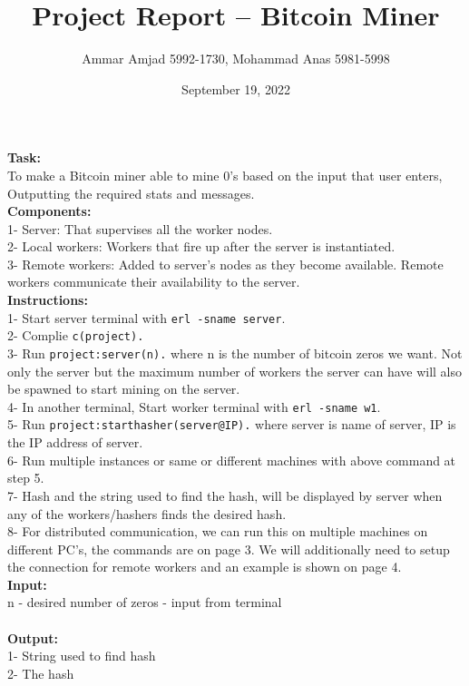 \documentclass[11pt, pdftex]{article}
\title{ Project Report – Bitcoin Miner }
\author{ Ammar Amjad 5992-1730, Mohammad Anas 5981-5998 }
\date{ September 19, 2022 }
\begin{document}
	\pagestyle{fancy}
	\fancyhead{}
	\fancyfoot{}
	\maketitle 
	
	
	\textbf{Task:} \\ 
	To make a Bitcoin miner able to mine 0’s based on the input that user enters, Outputting the required stats and messages. \\ 
	
	\textbf{Components:} \\
	1-	Server: That supervises all the worker nodes. \\
	2-	Local workers: Workers that fire up after the server is instantiated. \\
	3-	Remote workers: Added to server’s nodes as they become available. Remote workers communicate their availability to the server. \\
	
	\textbf{Instructions:} \\
	1-	Start server terminal with \texttt{erl -sname server}. \\
	2-	Complie \texttt{c(project).} \\
	3-	Run \texttt{project:server(n).} where n is the number of bitcoin zeros we want. Not only the server but the maximum number of workers the server can have will also be spawned to start mining on the server. \\
	4-	In another terminal, Start worker terminal with \texttt{erl -sname w1}. \\
	5-	Run \texttt{project:starthasher(server@IP).} where server is name of server, IP is the IP address of server. \\
	6-	Run multiple instances or same or different machines with above command at step 5. \\
	7-	Hash and the string used to find the hash, will be displayed by server when any of the workers/hashers finds the desired hash. \\
	8-	For distributed communication, we can run this on multiple machines on different PC’s, the commands are on page 3. We will additionally need to setup the connection for remote workers and an example is shown on page 4. \\
	
	\textbf{Input:} \\
	n - desired number of zeros - input from terminal\\ \\
	\textbf{Output:} \\
	1-	String used to find hash \\
	2-	The hash \\
	
\end{document}
